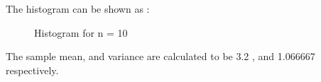 \documentclass[11pt]{article}
\begin{document}
The histogram can be shown as :

\begin{figure}[H]
  \centering
    \caption{Histogram for n = 10}
\end{figure}

The sample mean, and variance are calculated to be 3.2 , and 1.066667 respectively.
\end{document}
